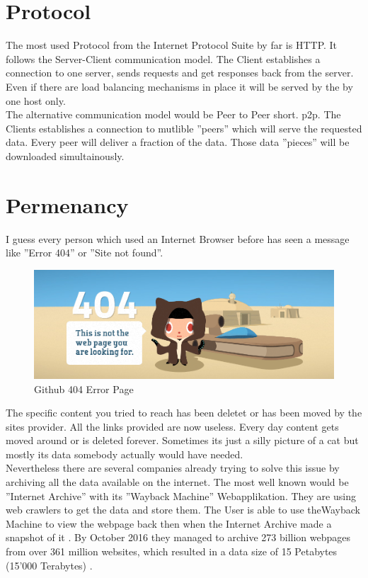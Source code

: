 \documentclass[a4paper,11pt, oneside]{report}
\theoremstyle{definition}
\begin{document}
\section{Protocol}
The most used Protocol from the Internet Protocol Suite by far is HTTP. It follows the Server-Client communication model. The Client establishes a connection to one server, sends requests and get responses back from the server. Even if there are load balancing mechanisms in place it will be served by the by one host only.\\[0.3cm]
The alternative communication model would be Peer to Peer short. p2p. The Clients establishes a connection to mutlible ''peers'' which will serve the requested data. Every peer will deliver a fraction of the data. Those data ''pieces'' will be downloaded simultainously.

\newpage
\section{Permenancy}
I guess every person which used an Internet Browser before has seen a message like ''Error 404'' or ''Site not found''.
\begin{figure}[H]
\centering
\includegraphics[width=\textwidth]{img/github-404.png}
\caption[Github 404 Error Page]{Github 404 Error Page}
\end{figure}
\noindent
The specific content you tried to reach has been deletet or has been moved by the sites provider. All the links provided are now useless. Every day content gets moved around or is deleted forever. Sometimes its just a silly picture of a cat but mostly its data somebody actually would have needed.\\[0.3cm]
Nevertheless there are several companies already trying to solve this issue by archiving all the data available on the internet. The most well known would be ''Internet Archive'' with its ''Wayback Machine'' Webapplikation. They are using web crawlers to get the data and store them. The User is able to use theWayback Machine to view the webpage back then when the Internet Archive made a snapshot of it \cite{InternetArchive}. By October 2016 they managed to archive 273 billion webpages from over 361 million websites, which resulted in a data size of 15 Petabytes (15'000 Terabytes) \cite{InternetArchiveCount}.
\end{document}
